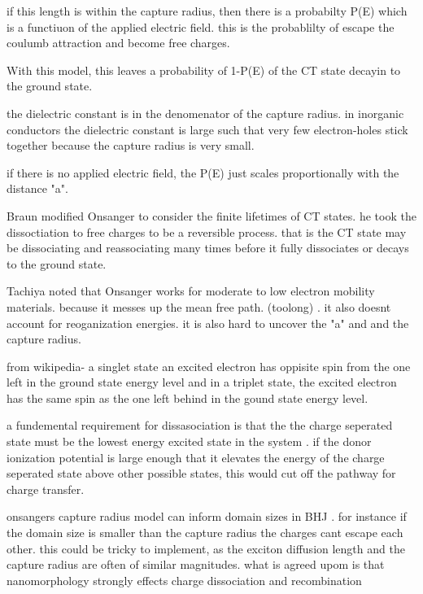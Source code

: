     if this length is within the capture radius, then there is a probabilty P(E) which is a functiuon of the
        applied electric field. this is the probablilty of escape the coulumb attraction and become free charges.

    With this model, this leaves a probability of 1-P(E) of the CT state decayin to the ground state. 

    the dielectric constant is in the denomenator of the capture radius. in inorganic conductors the dielectric 
    constant is large such that very few electron-holes stick together because the capture radius is very small. 

    if there is no applied electric field, the P(E) just scales proportionally with the distance "a". 

    Braun modified Onsanger to consider the finite lifetimes of CT states. he took the dissoctiation 
    to free charges to be a reversible process. that is the CT state may be dissociating and reassociating
    many times before it fully dissociates or decays to the ground state. 

    Tachiya noted that Onsanger works for moderate to low electron mobility materials. because it messes up the 
    mean free path. (toolong) . it also doesnt account for reoganization energies. it is also hard to uncover the
    "a" and and the capture radius. 

    from wikipedia- a singlet state an excited electron has oppisite spin from the one left in the ground
    state energy level  and in a triplet state, the excited electron has the same spin as the one left behind
    in the gound state energy level. 

    a fundemental requirement for dissasociation is that the the charge seperated state must be the
    lowest energy excited state in the system . if the donor ionization potential is large enough that 
    it elevates the energy of the charge seperated state above other possible states, this would cut off
    the pathway for charge transfer.

    onsangers capture radius model can inform domain sizes in BHJ . for instance if the domain size
    is smaller than the capture radius the charges cant escape each other. this could be tricky to implement,
    as the exciton diffusion length and the capture radius are often of similar magnitudes. what is agreed upom 
    is that nanomorphology strongly effects charge dissociation and recombination

	

